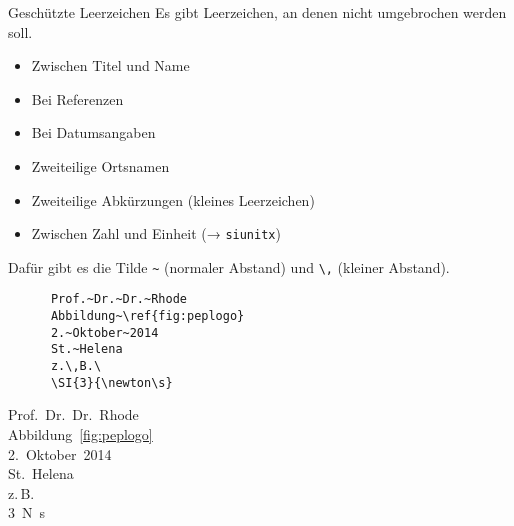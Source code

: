 \begin{frame}[fragile]{Geschützte Leerzeichen}
  Es gibt Leerzeichen, an denen nicht umgebrochen werden soll. \\
  \begin{itemize}
    \item Zwischen Titel und Name
    \item Bei Referenzen
    \item Bei Datumsangaben
    \item Zweiteilige Ortsnamen
    \item Zweiteilige Abkürzungen (kleines Leerzeichen)
    \item Zwischen Zahl und Einheit (→ \texttt{siunitx})
  \end{itemize}
  Dafür gibt es die Tilde \lstinline+~+ (normaler Abstand) und \lstinline+\,+ (kleiner Abstand).
  \begin{CodeExample}{0.5}
    \begin{lstlisting}
      Prof.~Dr.~Dr.~Rhode
      Abbildung~\ref{fig:peplogo}
      2.~Oktober~2014
      St.~Helena
      z.\,B.\
      \SI{3}{\newton\s}
    \end{lstlisting}
    \CodeResult
      \strut
      Prof.~Dr.~Dr.~Rhode \\
      Abbildung~\ref{fig:peplogo} \\
      2.~Oktober~2014 \\
      St.~Helena \\
      z.\,B.\ \\
      \SI{3}{\newton\s}
  \end{CodeExample}
\end{frame}


